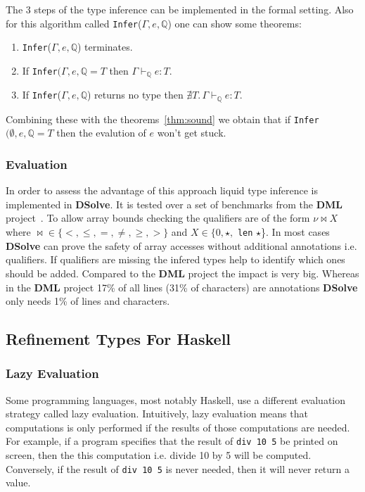 \documentclass[a4paper,UKenglish]{lipics-v2016}
\begin{document}
The 3 steps of the type inference can be implemented in the formal setting.
Also for this algorithm called \lstinline{Infer}($\Gamma, e, \mathbb{Q}$) one can show some theorems:
\begin{enumerate}
    \item \lstinline{Infer}($\Gamma, e, \mathbb{Q}$) terminates.
    \item If \lstinline{Infer}$(\Gamma, e, \mathbb{Q} = T$ then $\Gamma \vdash_{\mathbb{Q}} e: T$.
    \item If \lstinline{Infer}($\Gamma, e, \mathbb{Q}$) returns no type then $\nexists T.\, \Gamma \vdash_{\mathbb{Q}} e: T$.
\end{enumerate}

Combining these with the theorems~\ref{thm:sound} we obtain that if \lstinline{Infer}$(\emptyset, e, \mathbb{Q} = T$ then the evalution of $e$ won't get stuck.

\subsubsection{Evaluation}

In order to assess the advantage of this approach liquid type inference is implemented in \textbf{DSolve}.
It is tested over a set of benchmarks from the \textbf{DML} project~\cite{Xi:1998:EAB}.
To allow array bounds checking the qualifiers are of the form $\nu \bowtie X$ where $\bowtie \in \{<, \le, =, \neq, \geq, >\}$ and $X \in \{0, \star,$ \lstinline{len} $\star$\}.
In most cases \textbf{DSolve} can prove the safety of array accesses without additional annotations i.e. qualifiers.
If qualifiers are missing the infered types help to identify which ones should be added.
Compared to the \textbf{DML} project the impact is very big.
Whereas in the \textbf{DML} project 17\% of all lines (31\% of characters) are annotations \textbf{DSolve} only needs 1\% of lines and characters.

  \subsection{Refinement Types For Haskell}

    \subsubsection{Lazy Evaluation}

      Some programming languages, most notably Haskell, use a different
      evaluation strategy called lazy evaluation.  Intuitively, lazy evaluation
      means that computations is only performed if the results of those
      computations are needed.  For example, if a program specifies that the
      result of \texttt{div 10 5} be printed on screen, then the this
      computation i.e. divide 10 by 5 will be computed.  Conversely, if the
      result of \texttt{div 10 5} is never needed, then it will never return a
      value.  
\end{document}
